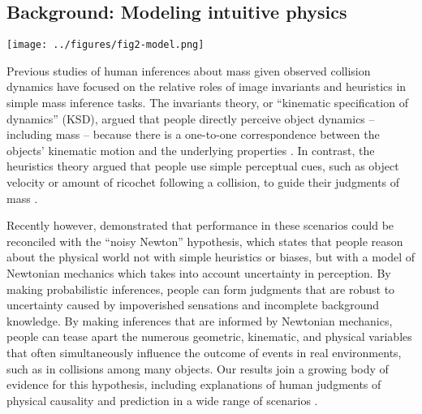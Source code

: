 \documentclass[10pt,letterpaper]{article}
\newcommand{\rand}[1]{random-order #1}
\begin{document}
\subsection{Background: Modeling intuitive physics}

\begin{figure*}[t]
  \begin{center}
    \texttt{[image: ../figures/fig2-model.png]}
    \caption{\small (A) An example of how different values of $r_0$
      can affect the outcome, $q(G^\prime, G)$. In this case, if
      $r_0=10$, then the yellow blocks counterbalance the red ones and
      the tower is precariously stable. If $r_0=0.1$, then the red
      blocks cause the tower to topple over. (B) The ideal observer
      model's posterior distribution over mass ratio, $P(r|K_t)$ for
      each text feedback condition and trial ordering used in the
      experiment. As expected, the ideal observer converges on the
      correct end of the spectrum. Note that trial ordering can
      significantly delay learning, however, as is the case for the
      \rand{} with $r_0=0.1$ feedback.}
    \label{fig:model}
  \end{center}
\end{figure*}

Previous studies of human inferences about mass given observed
collision dynamics have focused on the relative roles of image
invariants and heuristics in simple mass inference tasks. The
invariants theory, or ``kinematic specification of dynamics'' (KSD),
argued that people directly perceive object dynamics -- including mass
-- because there is a one-to-one correspondence between the objects'
kinematic motion and the underlying properties \cite{Runeson2000}. In
contrast, the heuristics theory argued that people use simple
perceptual cues, such as object velocity or amount of ricochet
following a collision, to guide their judgments of mass
\cite{Todd1982,Gilden1994}.

Recently however,  demonstrated that performance in
these scenarios could be reconciled with the ``noisy Newton''
hypothesis, which states that people reason about the physical world
not with simple heuristics or biases, but with a model of Newtonian
mechanics which takes into account uncertainty in perception. By
making probabilistic inferences, people can form judgments that are
robust to uncertainty caused by impoverished sensations and incomplete
background knowledge. By making inferences that are informed by
Newtonian mechanics, people can tease apart the numerous geometric,
kinematic, and physical variables that often simultaneously influence
the outcome of events in real environments, such as in collisions
among many objects. Our results join a growing body of evidence for
this hypothesis, including explanations of human judgments of physical
causality and prediction in a wide range of scenarios
\cite{Sanborn2013,Hamrick2011,Smith2012,Gerstenberg2012}.
\end{document}
